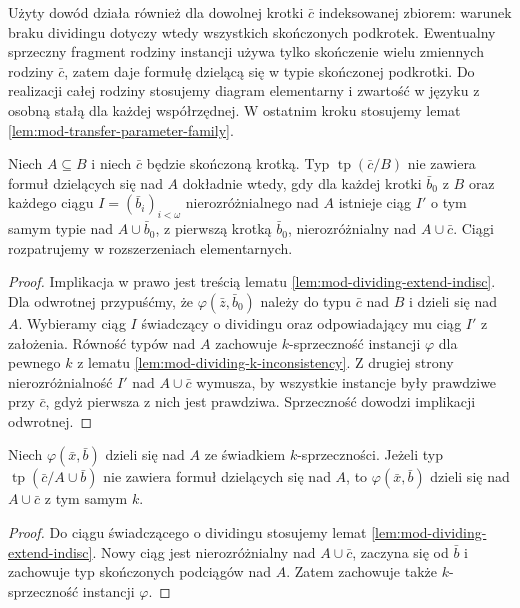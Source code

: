 Użyty dowód działa również dla dowolnej
krotki $\bar c$ indeksowanej zbiorem:
warunek braku dividingu dotyczy wtedy
wszystkich skończonych podkrotek.
Ewentualny sprzeczny fragment rodziny instancji
używa tylko skończenie wielu zmiennych rodziny
$\bar c$, zatem daje formułę dzielącą się
w typie skończonej podkrotki.
Do realizacji całej rodziny stosujemy diagram
elementarny i zwartość w języku z osobną stałą
dla każdej współrzędnej. W ostatnim kroku
stosujemy lemat
\ref{lem:mod-transfer-parameter-family}.

\begin{wniosek}
\label{cor:mod-nondividing-indiscernible-criterion}
Niech $A\subseteq B$ i niech $\bar c$
będzie skończoną krotką.
Typ $\operatorname{tp}(\bar c/B)$
nie zawiera formuł dzielących się nad $A$
dokładnie wtedy, gdy dla każdej krotki
$\bar b_0$ z $B$ oraz każdego ciągu
$I=(\bar b_i)_{i<\omega}$ nierozróżnialnego
nad $A$ istnieje ciąg $I'$ o tym samym
typie nad $A\cup\bar b_0$, z pierwszą
krotką $\bar b_0$, nierozróżnialny
nad $A\cup\bar c$.
Ciągi rozpatrujemy w rozszerzeniach elementarnych.
\end{wniosek}
\begin{proof}
Implikacja w prawo jest treścią lematu
\ref{lem:mod-dividing-extend-indisc}.
Dla odwrotnej przypuśćmy, że
$\varphi(\bar z,\bar b_0)$ należy
do typu $\bar c$ nad $B$ i dzieli się
nad $A$. Wybieramy ciąg $I$ świadczący
o dividingu oraz odpowiadający mu
ciąg $I'$ z założenia.
Równość typów nad $A$ zachowuje
$k$-sprzeczność instancji $\varphi$
dla pewnego $k$ z lematu
\ref{lem:mod-dividing-k-inconsistency}.
Z drugiej strony nierozróżnialność $I'$
nad $A\cup\bar c$ wymusza, by wszystkie
instancje były prawdziwe przy $\bar c$,
gdyż pierwsza z nich jest prawdziwa.
Sprzeczność dowodzi implikacji odwrotnej.
\end{proof}

\begin{wniosek}
\label{cor:mod-dividing-base-enlargement}
Niech $\varphi(\bar x,\bar b)$ dzieli się
nad $A$ ze świadkiem $k$-sprzeczności.
Jeżeli typ $\operatorname{tp}(\bar c/A\cup\bar b)$
nie zawiera formuł dzielących się nad $A$,
to $\varphi(\bar x,\bar b)$ dzieli się
nad $A\cup\bar c$ z tym samym $k$.
\end{wniosek}
\begin{proof}
Do ciągu świadczącego o dividingu stosujemy
lemat \ref{lem:mod-dividing-extend-indisc}.
Nowy ciąg jest nierozróżnialny nad $A\cup\bar c$,
zaczyna się od $\bar b$ i zachowuje
typ skończonych podciągów nad $A$.
Zatem zachowuje także $k$-sprzeczność
instancji $\varphi$.
\end{proof}

